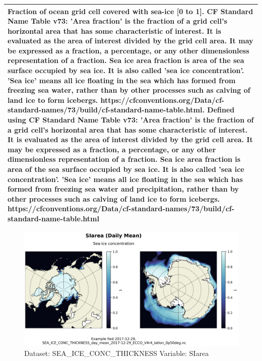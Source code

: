 \begin{longtable}{|m{}|m{}|m{}|m{}|}
\multicolumn{4}{|p{1\textwidth}|}{Fraction of ocean grid cell covered with sea-ice [0 to 1]. CF Standard Name Table v73:  'Area fraction' is the fraction of a grid cell's horizontal area that has some characteristic of interest. It is evaluated as the area of interest divided by the grid cell area. It may be expressed as a fraction, a percentage, or any other dimensionless representation of a fraction. Sea ice area fraction is area of the sea surface occupied by sea ice. It is also called 'sea ice concentration'. 'Sea ice' means all ice floating in the sea which has formed from freezing sea water, rather than by other processes such as calving of land ice to form icebergs. https://cfconventions.org/Data/cf-standard-names/73/build/cf-standard-name-table.html. Defined using CF Standard Name Table v73: 'Area fraction' is the fraction of a grid cell's horizontal area that has some characteristic of interest. It is evaluated as the area of interest divided by the grid cell area. It may be expressed as a fraction, a percentage, or any other dimensionless representation of a fraction. Sea ice area fraction is area of the sea surface occupied by sea ice. It is also called 'sea ice concentration'. 'Sea ice' means all ice floating in the sea which has formed from freezing sea water and precipitation, rather than by other processes such as calving of land ice to form icebergs. https://cfconventions.org/Data/cf-standard-names/73/build/cf-standard-name-table.html} \\ \hline
\end{longtable}

\begin{figure}[H]
\centering
\includegraphics[scale=0.55]{../images/plots/latlon_plots/Sea-Ice_and_Snow_Concentration_and_Thickness/SIarea.png}
\caption{Dataset: SEA\_ICE\_CONC\_THICKNESS Variable: SIarea}
\label{tab:table-SEA_ICE_CONC_THICKNESS_SIarea-Plot}
\end{figure}
\pagebreak
